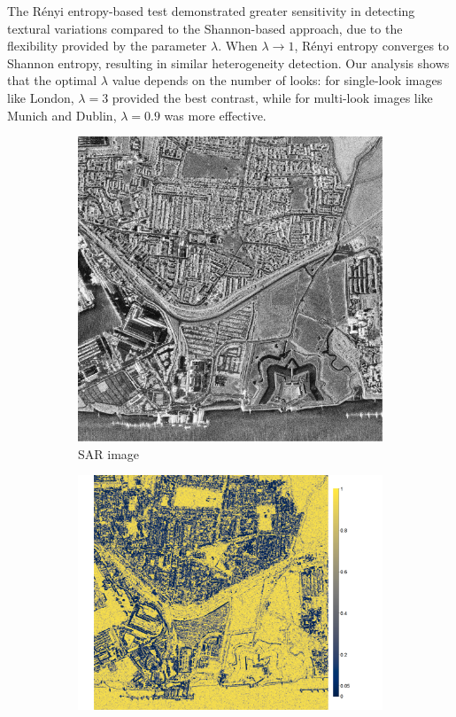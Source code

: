 \documentclass[
  journal,
]{IEEEtran}%
\begin{document}
The Rényi entropy-based test demonstrated greater sensitivity in
detecting textural variations compared to the Shannon-based approach,
due to the flexibility provided by the parameter \(\lambda\). When
\(\lambda \to 1\), Rényi entropy converges to Shannon entropy, resulting
in similar heterogeneity detection. Our analysis shows that the optimal
\(\lambda\) value depends on the number of looks: for single-look images
like London, \(\lambda = 3\) provided the best contrast, while for
multi-look images like Munich and Dublin, \(\lambda = 0.9\) was more
effective.

\begin{figure}[hbt]
    \centering
    \begin{subfigure}{0.17\textwidth}
        \includegraphics[width=\linewidth]{./Figures/london_2000.png}
        \caption{ SAR image}
        \label{fig:1a}
    \end{subfigure}
    \begin{subfigure}{0.22\textwidth}
        \includegraphics[width=\linewidth]{./Figures/H_pvalue_london_renyi.png}

\end{subfigure}
\end{figure}
\end{document}
